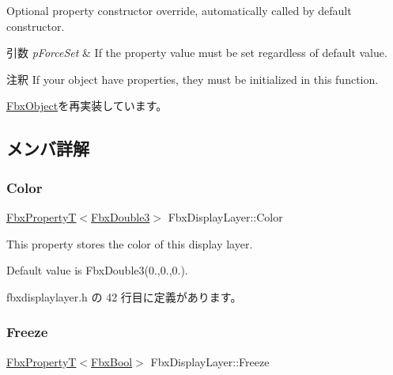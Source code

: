 Optional property constructor override, automatically called by default constructor. 
\begin{DoxyParams}{引数}
{\em p\+Force\+Set} & If the property value must be set regardless of default value. \\
\hline
\end{DoxyParams}
\begin{DoxyRemark}{注釈}
If your object have properties, they must be initialized in this function. 
\end{DoxyRemark}


\hyperlink{class_fbx_object_ad44f814323dc1b5e78bff1bfc608b4bb}{Fbx\+Object}を再実装しています。



\subsection{メンバ詳解}
\mbox{\label{class_fbx_display_layer_ab43c4c4514ffc390a0ae1d7997a2bf06}} 
\subsubsection{\texorpdfstring{Color}{Color}}
{\footnotesize\ttfamily \hyperlink{class_fbx_property_t}{Fbx\+PropertyT}$<$\hyperlink{fbxtypes_8h_ae0a96f14cde566774c7553aa7523b7a7}{Fbx\+Double3}$>$ Fbx\+Display\+Layer\+::\+Color}

This property stores the color of this display layer.

Default value is Fbx\+Double3(0.,0.,0.). 

 fbxdisplaylayer.\+h の 42 行目に定義があります。

\mbox{\label{class_fbx_display_layer_abbda272dffabbf9c54947efefcce141a}} 
\subsubsection{\texorpdfstring{Freeze}{Freeze}}
{\footnotesize\ttfamily \hyperlink{class_fbx_property_t}{Fbx\+PropertyT}$<$\hyperlink{fbxtypes_8h_a92e0562b2fe33e76a242f498b362262e}{Fbx\+Bool}$>$ Fbx\+Display\+Layer\+::\+Freeze}

